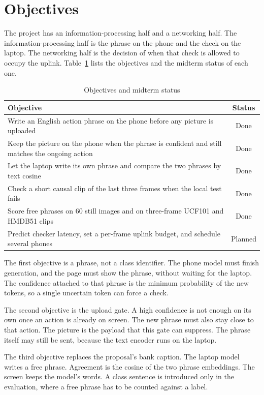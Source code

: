 \section{Objectives}
\label{sec:objectives}

The project has an information-processing half and a networking half. The
information-processing half is the phrase on the phone and the check on the
laptop. The networking half is the decision of when that check is allowed
to occupy the uplink. Table~\ref{tab:objectives} lists the objectives and
the midterm status of each one.

\begin{table}[t]
\caption{Objectives and midterm status}
\label{tab:objectives}
\centering
\footnotesize
\begin{tabular}{p{}c}
\toprule
Objective & Status \\
\midrule
Write an English action phrase on the phone before any picture is uploaded &
Done \\
Keep the picture on the phone when the phrase is confident and still matches the ongoing action &
Done \\
Let the laptop write its own phrase and compare the two phrases by text cosine &
Done \\
Check a short causal clip of the last three frames when the local test fails &
Done \\
Score free phrases on 60 still images and on three-frame UCF101 and HMDB51 clips &
Done \\
Predict checker latency, set a per-frame uplink budget, and schedule several phones &
Planned \\
\bottomrule
\end{tabular}
\end{table}

The first objective is a phrase, not a class identifier. The phone model
must finish generation, and the page must show the phrase, without waiting
for the laptop. The confidence attached to that phrase is the minimum
probability of the new tokens, so a single uncertain token can force a
check.

The second objective is the upload gate. A high confidence is not enough on
its own once an action is already on screen. The new phrase must also stay
close to that action. The picture is the payload that this gate can
suppress. The phrase itself may still be sent, because the text encoder
runs on the laptop.

The third objective replaces the proposal's bank caption. The laptop model
writes a free phrase. Agreement is the cosine of the two phrase embeddings.
The screen keeps the model's words. A class sentence is introduced only in
the evaluation, where a free phrase has to be counted against a label.

